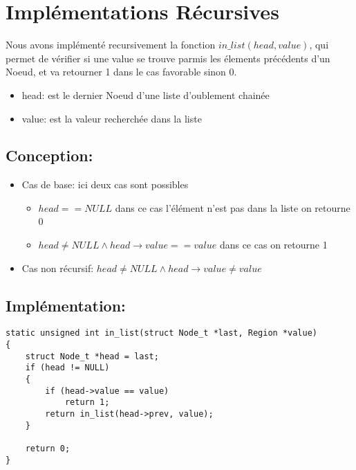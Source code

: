 \section{Implémentations Récursives}\label{recursivite}

\quad Nous avons implémenté recursivement la fonction $in\_list(head, value)$, qui permet de vérifier
si une value se trouve parmis les élements précédents d'un Noeud, et va retourner 1 dans le cas favorable
sinon 0.

\begin{itemize}
    \item head: est le dernier Noeud d'une liste d'oublement chainée
    \item value: est la valeur recherchée dans la liste
\end{itemize}

\subsection{Conception:}

\begin{itemize}
    \item Cas de base: ici deux cas sont possibles
        \indent
        \begin{itemize}
            \item $head == NULL$ dans ce cas l'élément n'est pas dans la liste on retourne 0
            \item $head \ne NULL \land head\to value == value$ dans ce cas on retourne 1
        \end{itemize}
    \item Cas non récursif: $head \ne NULL \land head\to value \ne value$
\end{itemize}

\subsection{Implémentation:}

\begin{lstlisting}
static unsigned int in_list(struct Node_t *last, Region *value)
{
    struct Node_t *head = last;
    if (head != NULL)
    {
        if (head->value == value)
            return 1;
        return in_list(head->prev, value);
    }
    
    return 0;
}
\end{lstlisting}

